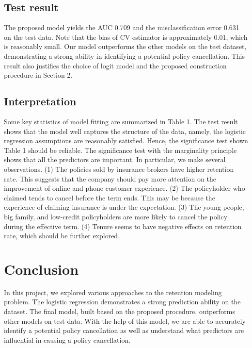 \documentclass[12pt]{amsart}
\theoremstyle{definition}
\theoremstyle{remark}
\numberwithin{equation}{section}
\begin{document}
\subsection{Test result}

The proposed model yields the AUC 0.709 and the misclassification error 0.631 on the test data. Note that the bias of CV estimator is approximately 0.01, which is reasonably small. Our model outperforms the other models on the test dataset, demonstrating a strong ability in identifying a potential policy cancellation. This result also justifies the choice of logit model and the proposed construction procedure in Section 2.

\subsection{Interpretation}

Some key statistics of model fitting are summarized in Table 1. The test result shows that the model well captures the structure of the data, namely, the logistic regression assumptions are reasonably satisfied. Hence, the significance test shown Table 1 should be reliable. The significance test with the marginality principle shows that all the predictors are important. In particular, we make several observations. 
(1) The policies sold by insurance brokers have higher retention rate. This suggests that the company should pay more attention on the improvement of online and phone customer experience. (2) The policyholder who claimed tends to cancel before the term ends. This may be because the experience of claiming insurance is under the expectation. (3) The young people, big family, and low-credit policyholders are more likely to cancel the policy during the effective term. (4) Tenure seems to have negative effects on retention rate, which should be further explored.  


\section{Conclusion}

In this project, we explored various approaches to the retention modeling problem. The logistic regression demonstrates a strong prediction ability on the dataset. The final model, built based on the proposed procedure, outperforms other models on test data. With the help of this model, we are able to accurately identify a potential policy cancellation as well as understand what predictors are influential in causing a policy cancellation. 
\end{document}
